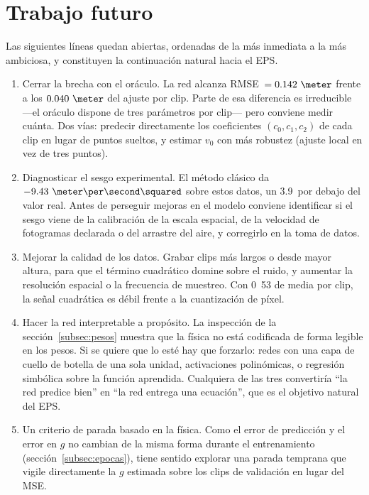 \documentclass[titlepage,11pt]{article}
\providecommand{\num}[1]{\ensuremath{#1}}
\providecommand{\SI}[2]{#1\,#2}
\providecommand{\percent}{\char37\relax}
\begin{document}
\section{Trabajo futuro}
\label{sec:trabajofuturo}

Las siguientes líneas quedan abiertas, ordenadas de la más inmediata a la más
ambiciosa, y constituyen la continuación natural hacia el EPS.

\begin{enumerate}
\item Cerrar la brecha con el oráculo. La red alcanza
  RMSE~$=\num{0.142}~\meter$ frente a los $\num{0.040}~\meter$ del ajuste por
  clip. Parte de esa diferencia es irreducible ---el oráculo dispone de tres
  parámetros por clip--- pero conviene medir cuánta. Dos vías: predecir
  directamente los coeficientes $(c_0,c_1,c_2)$ de cada clip en lugar de puntos
  sueltos, y estimar $v_0$ con más robustez (ajuste local en vez de tres puntos).

\item Diagnosticar el sesgo experimental. El método clásico da
  $\num{-9.43}~\meter\per\second\squared$ sobre estos datos, un
  \SI{3.9}{\percent} por debajo del valor real. Antes de perseguir mejoras en el
  modelo conviene identificar si el sesgo viene de la calibración de la escala
  espacial, de la velocidad de fotogramas declarada o del arrastre del aire, y
  corregirlo en la toma de datos.

\item Mejorar la calidad de los datos. Grabar clips más largos o desde
  mayor altura, para que el término cuadrático domine sobre el ruido, y aumentar
  la resolución espacial o la frecuencia de muestreo. Con
  \unit{0.53}{\second} de media por clip, la señal cuadrática es débil frente a
  la cuantización de píxel.

\item Hacer la red interpretable a propósito. La inspección de la
  sección~\ref{subsec:pesos} muestra que la física no está codificada de forma
  legible en los pesos. Si se quiere que lo esté hay que forzarlo: redes con una
  capa de cuello de botella de una sola unidad, activaciones polinómicas, o
  regresión simbólica sobre la función aprendida. Cualquiera de las tres
  convertiría \enquote{la red predice bien} en \enquote{la red entrega una
  ecuación}, que es el objetivo natural del EPS.

\item Un criterio de parada basado en la física. Como el error de
  predicción y el error en $g$ no cambian de la misma forma durante el entrenamiento
  (sección~\ref{subsec:epocas}), tiene sentido explorar una parada temprana que
  vigile directamente la $g$ estimada sobre los clips de validación en lugar del
  MSE.


\end{enumerate}
\end{document}
